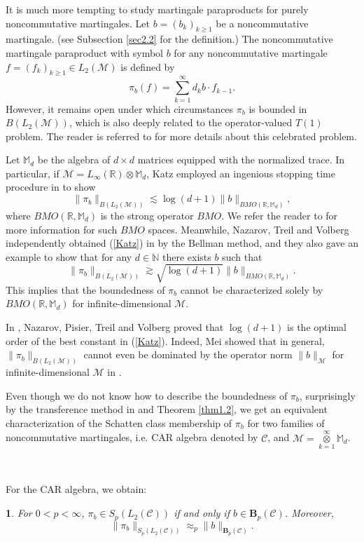 \documentclass[oneside,english,a4wide]{amsart}
\numberwithin{equation}{section}
\numberwithin{figure}{section}
\theoremstyle{plain}
\newtheorem{thm}{\protect\theoremname}[section]
\theoremstyle{plain}
\theoremstyle{definition}
\theoremstyle{plain}
\theoremstyle{remark}
\theoremstyle{definition}
\theoremstyle{remark}
\theoremstyle{definition}
\providecommand{\theoremname}{Theorem}
\newcommand{\M}{{\mathcal M}}
\newcommand{\8}{\infty}
\begin{document}
 It is much more tempting to study martingale paraproducts for purely noncommutative martingales. Let $b=(b_k)_{k\geq 1}$ be a noncommutative martingale. (see Subsection \ref{sec2.2} for the definition.) The noncommutative martingale paraproduct with symbol $b$ for any noncommutative martingale $f=(f_k)_{k\geq 1}\in L_2(\M)$ is defined by 
$$  \pi_b(f)=\sum_{k=1}^{\infty}d_kb \cdot f_{k-1}.  $$
However, it remains open under which circumstances $\pi_b$ is bounded in $B(L_2(\M))$, which is also deeply related to the operator-valued $T(1)$ problem. The reader is referred to \cite{HM} for more details about this celebrated problem.

 Let $\mathbb{M}_{d}$ be the algebra of $d\times d$ matrices equipped with the normalized trace. In particular, if $\M=L_\8(\mathbb{R})\otimes \mathbb{M}_d$, Katz employed an ingenious stopping time procedure in \cite{KNH} to show
\begin{equation}\label{Katz}
	\|\pi_b\|_{B(L_2(\M))}\lesssim \log (d+1) \|b\|_{BMO(\mathbb{R}, \mathbb{M}_{d})},
\end{equation}
where $BMO(\mathbb{R}, \mathbb{M}_{d})$ is the strong operator $BMO$. We refer the reader to \cite{Mei1} for more information for such $BMO$ spaces. Meanwhile, Nazarov, Treil and Volberg independently obtained  (\ref{Katz}) in \cite{NTV1} by the Bellman method, and they also gave an example to show that for any $d\in \mathbb{N}$ there exists $b$ such that
$$  \|\pi_b\|_{B(L_2(\M))}\gtrsim \sqrt{\log (d+1)} \|b\|_{BMO(\mathbb{R}, \mathbb{M}_{d})}.  $$
This implies that the boundedness of $\pi_b$ cannot be characterized solely by $BMO(\mathbb{R}, \mathbb{M}_{d})$ for infinite-dimensional $\M$.

In \cite{NPTV}, Nazarov, Pisier, Treil and Volberg proved that $\log{(d+1)}$ is the optimal order of the best constant in (\ref{Katz}).  Indeed, Mei showed that in general,  $\|\pi_b\|_{B(L_2(\M))}$ cannot even be dominated by the operator norm $\|b\|_{\M}$ for infinite-dimensional $\M$ in \cite{Mei}.

Even though we do not know how to describe the boundedness of $\pi_b$, surprisingly by the transference method in \cite{PX97} and Theorem \ref{thm1.2}, we get an equivalent characterization of the Schatten class membership of $\pi_b$ for two families of noncommutative martingales, i.e. CAR algebra denoted by $\mathcal{C}$, and $\mathscr{M}=\mathop{\otimes}\limits_{k=1}^{\infty}\mathbb{M}_{d}$.

\

For the CAR algebra, we obtain:
\begin{thm}\label{thm6.1}
	For $0<p<\infty$, $\pi_b\in S_p(L_2(\mathcal{C}))$ if and only if $b\in \pmb{B}_p(\mathcal{C})$. Moreover,
	$$ \|\pi_b\|_{S_p(L_2(\mathcal{C})) }\approx_p \|b\|_{\pmb{B}_p(\mathcal{C})}. $$
\end{thm}
\end{document}
